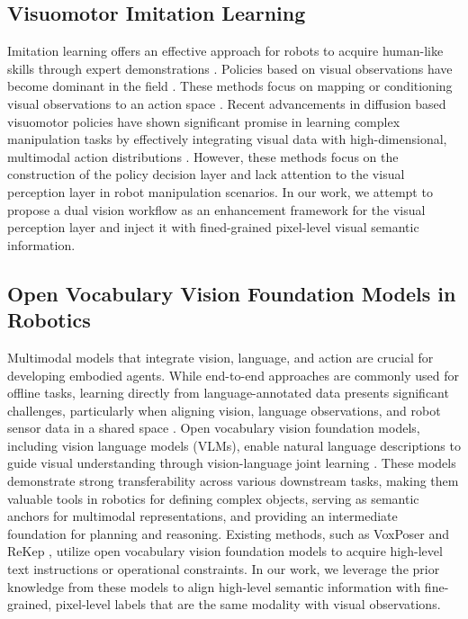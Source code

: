 \subsection{Visuomotor Imitation Learning}
Imitation learning offers an effective approach for robots to acquire human-like skills through expert demonstrations \citep{wang2023mimicplay, agarwal2023dexterous, haldar2023teach, seo2023deep, fu2024mobile}. Policies based on visual observations have become dominant in the field \citep{pari2021surprising, gervet2023act3d}. These methods focus on mapping or conditioning visual observations to an action space \citep{zhao2023learning, lin2024data}. Recent advancements in diffusion based visuomotor policies have shown significant promise in learning complex manipulation tasks by effectively integrating visual data with high-dimensional, multimodal action distributions \citep{chi2023diffusion, chi2024universal, zhao2024aloha, ze20243d}. However, these methods focus on the construction of the policy decision layer and lack attention to the visual perception layer in robot manipulation scenarios. In our work, we attempt to propose a dual vision workflow as an enhancement framework for the visual perception layer and inject it with fined-grained pixel-level visual semantic information.

\subsection{Open Vocabulary Vision Foundation Models in Robotics}
Multimodal models that integrate vision, language, and action are crucial for developing embodied agents. While end-to-end approaches are commonly used for offline tasks, learning directly from language-annotated data presents significant challenges, particularly when aligning vision, language observations, and robot sensor data in a shared space \citep{black2024pi_0, team2024octo}. Open vocabulary vision foundation models, including vision language models (VLMs), enable natural language descriptions to guide visual understanding through vision-language joint learning \citep{hurst2024gpt, liu2024visual}. These models demonstrate strong transferability across various downstream tasks, making them valuable tools in robotics for defining complex objects, serving as semantic anchors for multimodal representations, and providing an intermediate foundation for planning and reasoning. Existing methods, such as VoxPoser \citep{huang2023voxposer} and ReKep \cite{huang2024rekep}, utilize open vocabulary vision foundation models to acquire high-level text instructions or operational constraints. In our work, we leverage the prior knowledge from these models to align high-level semantic information with fine-grained, pixel-level labels that are  the same modality with visual observations.

